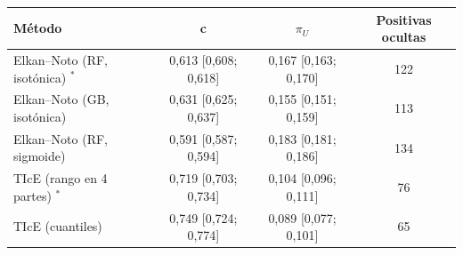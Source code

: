 \begin{tabular}{lccc}
\toprule
Método & c & $\pi_U$ & Positivas ocultas \\
\midrule
Elkan--Noto (RF, isotónica) $^{*}$ & 0,613 [0,608; 0,618] & 0,167 [0,163; 0,170] & 122 \\
Elkan--Noto (GB, isotónica) & 0,631 [0,625; 0,637] & 0,155 [0,151; 0,159] & 113 \\
Elkan--Noto (RF, sigmoide) & 0,591 [0,587; 0,594] & 0,183 [0,181; 0,186] & 134 \\
TIcE (rango en 4 partes) $^{*}$ & 0,719 [0,703; 0,734] & 0,104 [0,096; 0,111] & 76 \\
TIcE (cuantiles) & 0,749 [0,724; 0,774] & 0,089 [0,077; 0,101] & 65 \\
\bottomrule
\end{tabular}
